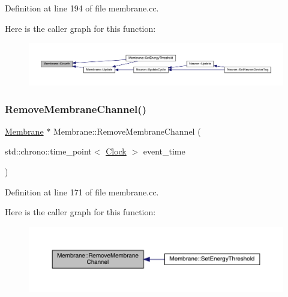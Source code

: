 Definition at line 194 of file membrane.\+cc.

Here is the caller graph for this function\+:
\nopagebreak
\begin{figure}[H]
\begin{center}
\leavevmode
\includegraphics[width=350pt]{class_membrane_a544742864485b9ac052f3b241ae5c6b4_icgraph}
\end{center}
\end{figure}
\mbox{\label{class_membrane_a36d6927c8869cc752b55623dac661107}} 
\subsubsection{\texorpdfstring{Remove\+Membrane\+Channel()}{RemoveMembraneChannel()}}
{\footnotesize\ttfamily \hyperlink{class_membrane}{Membrane} $\ast$ Membrane\+::\+Remove\+Membrane\+Channel (\begin{DoxyParamCaption}\item[{std\+::chrono\+::time\+\_\+point$<$ \hyperlink{universe_8h_a0ef8d951d1ca5ab3cfaf7ab4c7a6fd80}{Clock} $>$}]{event\+\_\+time }\end{DoxyParamCaption})}



Definition at line 171 of file membrane.\+cc.

Here is the caller graph for this function\+:
\nopagebreak
\begin{figure}[H]
\begin{center}
\leavevmode
\includegraphics[width=350pt]{class_membrane_a36d6927c8869cc752b55623dac661107_icgraph}
\end{center}
\end{figure}
\mbox{\label{class_membrane_ac33ffd86416112420dc5b0576287c44d}} 
